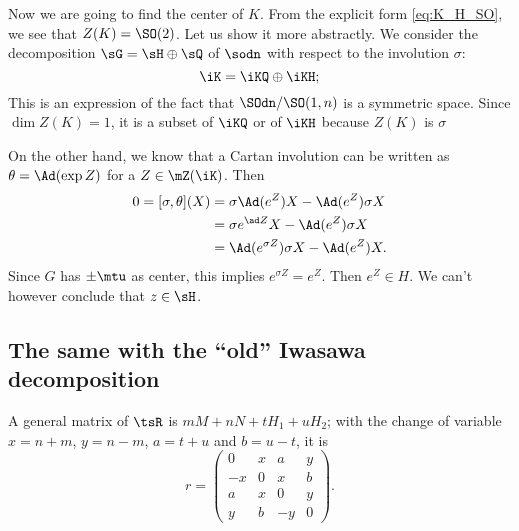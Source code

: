 Now we are going to find the center of $K$. From the explicit form \eqref{eq:K_H_SO}, we see that $Z(K)=\SO(2)$. Let us show it more abstractly. We consider the decomposition $\sG=\sH\oplus\sQ$ of $\sodn$ with respect to the involution $\sigma$:
\[
	\iK=\iKQ\oplus\iKH;
\]
This is an expression of the fact that $\SOdn/\SO(1,n)$ is a symmetric space. Since $\dim Z(K)=1$, it is a subset of $\iKQ$ or of $\iKH$ because $Z(K)$ is $\sigma$

On the other hand, we know that a Cartan involution can be written as $\theta=\Ad(\exp Z)$ for a $Z\in \mZ(\iK)$. Then
\begin{equation}
	\begin{split}
		0=[\sigma,\theta](X)&=\sigma\Ad(e^Z)X-\Ad(e^Z)\sigma X\\
		&=\sigma e^{\ad Z}X-\Ad(e^Z)\sigma X\\
		&=\Ad(e^{\sigma Z})\sigma X-\Ad(e^Z)X.
	\end{split}
\end{equation}
Since $G$ has $\pm\mtu$ as center, this implies $e^{\sigma Z}=e^Z$. Then $e^Z\in H$. We can't however conclude that $z\in\sH$.

\subsection{The same with the ``old'' Iwasawa decomposition}

A general matrix of $\tsR$ is $mM+nN+tH_1+uH_2$; with the change of variable $x=n+m$, $y=n-m$, $a=t+u$ and $b=u-t$, it is
\begin{equation}
	r=
	\begin{pmatrix}
		0  & x & a  & y \\
		-x & 0 & x  & b \\
		a  & x & 0  & y \\
		y  & b & -y & 0
	\end{pmatrix}.
\end{equation}

